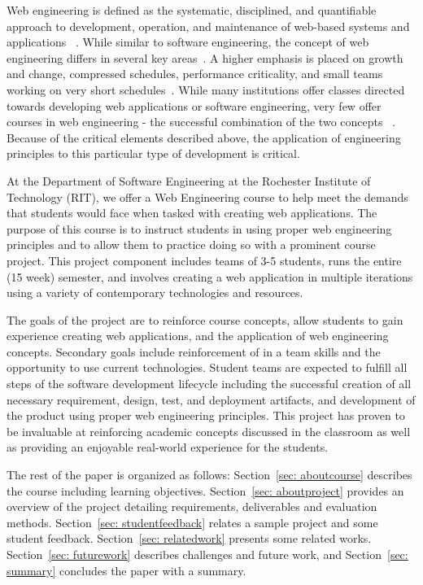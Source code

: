 \documentclass[conference]{IEEEtran}
\begin{document}
Web engineering is defined as the systematic, disciplined, and quantifiable approach to development, operation, and maintenance of web-based systems and applications ~\cite{Schummer:2005:TDS:1149293.1149369,Mendes:2003:ACF:858403.858417,Reif:2005:WWE:1060745.1060849}. While similar to software engineering, the concept of web engineering differs in several key areas~\cite{Ginige:2002:WEM:568760.568885}. A higher emphasis is placed on growth and change, compressed schedules, performance criticality, and small teams working on very short schedules~\cite{Deshpande:2002:WE:2011098.2011101}. While many institutions offer classes directed towards developing web applications or software engineering, very few offer courses in web engineering - the successful combination of the two concepts ~\cite{tufts_webengineering,csun_webengineering}. Because of the critical elements described above, the application of engineering principles to this particular type of development is critical.

At the Department of Software Engineering at the Rochester Institute of Technology (RIT), we offer a Web Engineering course to help meet the demands that students would face when tasked with creating web applications. The purpose of this course is to instruct students in using proper web engineering principles and to allow them to practice doing so with a prominent course project. This project component includes teams of 3-5 students, runs the entire (15 week) semester, and involves creating a web application in multiple iterations using a variety of contemporary technologies and resources.

The goals of the project are to reinforce course concepts, allow students to gain experience creating web applications, and the application of web engineering concepts. Secondary goals include reinforcement of in a team skills and the opportunity to use current technologies. Student teams are expected to fulfill all steps of the software development lifecycle including the successful creation of all necessary requirement, design, test, and deployment artifacts, and development of the product using proper web engineering principles. This project has proven to be invaluable at reinforcing academic concepts discussed in the classroom as well as providing an enjoyable real-world experience for the students.

The rest of the paper is organized as follows: Section~\ref{sec: aboutcourse} describes the course including learning objectives. Section~\ref{sec: aboutproject} provides an overview of the project detailing requirements, deliverables and evaluation methods. Section~\ref{sec: studentfeedback} relates a sample project and some student feedback. Section~\ref{sec: relatedwork} presents some related works. Section~\ref{sec: futurework} describes challenges and future work, and Section~\ref{sec: summary} concludes the paper with a summary.
\end{document}
